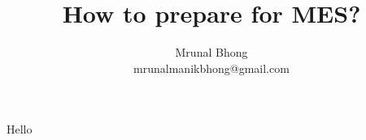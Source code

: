 \documentclass[12pt]{article}
\title{How to prepare for MES?}
\author{Mrunal Bhong\\mrunalmanikbhong@gmail.com}
\begin{document}
\maketitle
Hello
\end{document}
